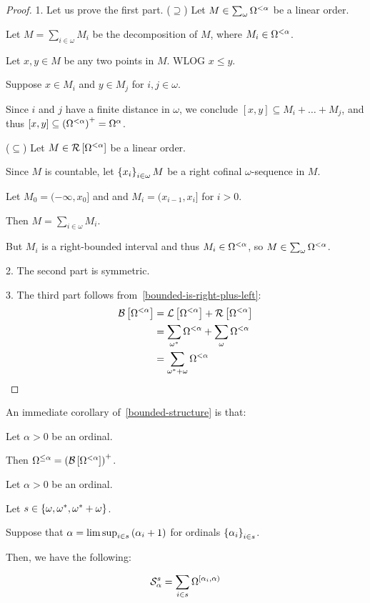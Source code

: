 \begin{proof}
  1. Let us prove the first part.
  ($\supseteq$) Let $M \in \sum_{\omega}{\Omega^{< \alpha}}$ be a linear order.

  Let $M = \sum_{i \in \omega} M_i$ be the decomposition of $M$,
  where $M_i \in \Omega^{< \alpha}$.

  Let $x, y \in M$ be any two points in $M$. WLOG $x \le y$.

  Suppose $x \in M_i$ and $y \in M_j$ for $i, j \in \omega$.

  Since $i$ and $j$ have a finite distance in $\omega$,
  we conclude $[x, y] \subseteq M_i + \ldots + M_j$,
  and thus $[x, y] \subseteq \left( {\Omega^{< \alpha}} \right)^+ = \Omega^{{\alpha}}$.

  ($\subseteq$) Let $M \in \mathcal{R} \left[ {{\Omega^{< \alpha}}} \right]$ be a linear order.

  Since $M$ is countable, let $\left\{ {x_i} \right\}_{i \in \omega} M$ be a right cofinal
  $\omega$-sequence in $M$.

  Let $M_0 = (-\infty, x_0]$ and and $M_i = (x_{i-1}, x_{i}]$ for $i > 0$.

  Then $M = \sum_{i \in \omega} M_i$.

  But $M_i$ is a right-bounded interval and thus $M_i \in \Omega^{< \alpha}$, so $M \in \sum_{\omega}{\Omega^{< \alpha}}$.

  2. The second part is symmetric.

  3. The third part follows from~\cref{bounded-is-right-plus-left}:
  \begin{align*}
    \mathcal{B} \left[ {{\Omega^{< \alpha}}} \right]
     & = \mathcal{L} \left[ {{\Omega^{< \alpha}}} \right] + \mathcal{R} \left[ {{\Omega^{< \alpha}}} \right]                     \\
     & = \sum_{\omega^\ast}{\Omega^{< \alpha}} + \sum_{\omega}{\Omega^{< \alpha}} \\
     & = \sum_{\omega^\ast + \omega}{\Omega^{< \alpha}}
  \end{align*}
\end{proof}

An immediate corollary of~\cref{bounded-structure} is that:
\begin{corollary}
  Let $\alpha > 0$ be an ordinal.

  Then $\Omega^{\le \alpha} = \left( {\mathcal{B} \left[ {{\Omega^{< \alpha}}} \right]} \right)^+$.
\end{corollary}

\begin{lemma}\label{shape-structure}
  Let $\alpha > 0$ be an ordinal.

  Let $s \in \left\{ {\omega, \omega^\ast, \omega^\ast + \omega} \right\}$.

  Suppose that
  $\alpha = \limsup_{i \in s} \left( {\alpha_i + 1} \right)$ for
  ordinals $\left\{ {\alpha_i} \right\}_{i \in s}$.

  Then, we have the following:

  \[
    \mathcal{S}^{s}_{\alpha} = \sum_{i \in s}{\Omega^{[\alpha_i, \alpha)}}
  \]
\end{lemma}

